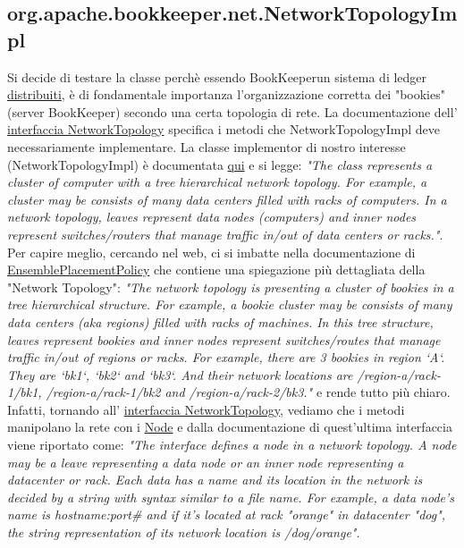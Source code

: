\documentclass[10pt, a4paper]{article}
\def\bookkeeper{BookKeeper}
\begin{document}
	\subsection{org.apache.bookkeeper.net.NetworkTopologyImpl}
	Si decide di testare la classe perchè essendo \bookkeeper un sistema di ledger \underline{distribuiti}, è di fondamentale importanza l'organizzazione
	corretta dei "bookies" (server \bookkeeper) secondo una certa topologia di rete. La documentazione dell'
	\href{https://bookkeeper.apache.org/docs/latest/api/javadoc/org/apache/bookkeeper/net/NetworkTopology.html}{interfaccia NetworkTopology} specifica i
	metodi che NetworkTopologyImpl deve necessariamente implementare. La classe implementor di nostro interesse (NetworkTopologyImpl) è documentata 
	\href{https://bookkeeper.apache.org/docs/latest/api/javadoc/org/apache/bookkeeper/net/NetworkTopologyImpl.html}{qui} e si legge:
	\textit{"The class represents a cluster of computer with a tree hierarchical network topology. 
	For example, a cluster may be consists of many data centers filled with racks of computers. In a network topology, 
	leaves represent data nodes (computers) and inner nodes represent switches/routers that manage traffic in/out of data centers or racks."}.
	Per capire meglio, cercando nel web, ci si imbatte nella documentazione di 
	\href{https://bookkeeper.apache.org/docs/latest/api/javadoc/org/apache/bookkeeper/client/EnsemblePlacementPolicy.html}{EnsemblePlacementPolicy} 
	che contiene una spiegazione più dettagliata della "Network Topology": 
	\textit{"The network topology is presenting a cluster of bookies in a tree hierarchical structure. 
	For example, a bookie cluster may be consists of many data centers (aka regions) filled with racks of machines. 
	In this tree structure, leaves represent bookies and inner nodes represent switches/routes that manage traffic in/out of regions or racks.
	For example, there are 3 bookies in region `A`. They are `bk1`, `bk2` and `bk3`. And their network locations are /region-a/rack-1/bk1, 
	/region-a/rack-1/bk2 and /region-a/rack-2/bk3."} e rende tutto più chiaro. Infatti, tornando all'
	\href{https://bookkeeper.apache.org/docs/latest/api/javadoc/org/apache/bookkeeper/net/NetworkTopology.html}{interfaccia NetworkTopology}, vediamo che i metodi
	manipolano la rete con i \href{https://bookkeeper.apache.org/docs/latest/api/javadoc/org/apache/bookkeeper/net/Node.html}{Node} e dalla documentazione di
	quest'ultima interfaccia viene riportato come: \textit{"The interface defines a node in a network topology. A node may be a leave representing a data node 
	or an inner node representing a datacenter or rack. Each data has a name and its location in the network is decided by a string with syntax similar to a file name. 
	For example, a data node's name is hostname:port\# and if it's located at rack "orange" in datacenter "dog", the string representation of its network location is /dog/orange"}.
\end{document}
